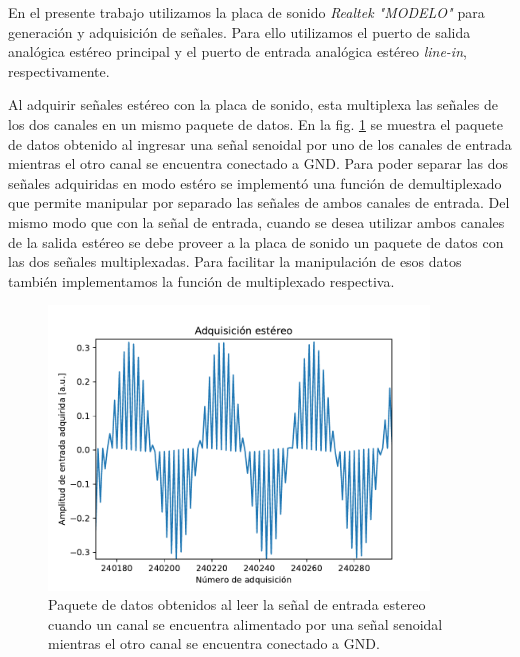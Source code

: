 \documentclass[a4paper,11pt]{article}
\begin{document}
En el presente trabajo utilizamos la placa de sonido \emph{Realtek
"MODELO"} para generación y adquisición de señales.  Para ello
utilizamos el puerto de salida analógica estéreo principal y el puerto
de entrada analógica estéreo \emph{line-in}, respectivamente.

Al adquirir señales estéreo con la placa de sonido, esta multiplexa las
señales de los dos canales en un mismo paquete de datos. En la
fig. \ref{fig:multiplexado} se muestra el paquete de datos
obtenido al ingresar una señal senoidal por uno de los canales de
entrada mientras el otro canal se encuentra conectado a
GND.
Para poder separar las dos señales adquiridas en modo estéro se
implementó una función de demultiplexado que permite manipular por
separado las señales de ambos canales de entrada.  Del mismo modo que
con la señal de entrada, cuando se desea utilizar ambos canales de la
salida estéreo se debe proveer a la placa de sonido un paquete de datos
con las dos señales multiplexadas. Para facilitar la manipulación de esos
datos también implementamos la función de multiplexado respectiva.

    \begin{figure}[!h] 
        \centering
        \includegraphics[width=0.9\textwidth]{imagenes/estereo.pdf}
        \caption{Paquete de datos obtenidos al leer la señal de entrada
estereo cuando un canal se encuentra alimentado por una señal senoidal
mientras el otro canal se encuentra conectado a GND.}
        \label{fig:multiplexado} 
    \end{figure}
\end{document}
